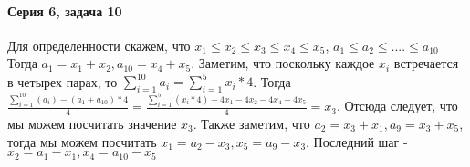 \documentclass{article}
\begin{document}
	\paragraph{Серия 6, задача 10}
	\hspace{\fill}
	\newline
	Для определенности скажем, что \newline 
	$x_1 \le x_2 \le x_3 \le x_4 \le x_5$, \newline 
	$a_1 \le a_2 \le .... \le a_{10}$ \newline
	Тогда $a_1 = x_1 + x_2, a_{10} = x_4 + x_5$.
	Заметим, что поскольку каждое $x_i$ встречается в четырех парах, то 
	$\sum_{i = 1}^{10} a_i = \sum_{i=1}^5 x_i * 4$.
	\newline
	Тогда $\frac{\sum_{i=1}^{10}(a_i) - (a_1 + a_{10}) * 4}{4} = 					\frac{\sum_{i=1}^5(x_i * 4) - 4x_1 - 4x_2 - 4x_4 - 4x_5}{4} = x_3$. Отсюда следует, что мы можем посчитать значение $x_3$.
	\newline	
	Также заметим, что $a_2 = x_3 + x_1, a_9 = x_3 + x_5$, тогда мы можем посчитать $x_1 = a_2 - x_3, x_5 = a_9 - x_3$.
	\newline
	Последний шаг - $x_2 = a_1 - x_1, x_4 = a_{10} - x_5$
	
\end{document}
